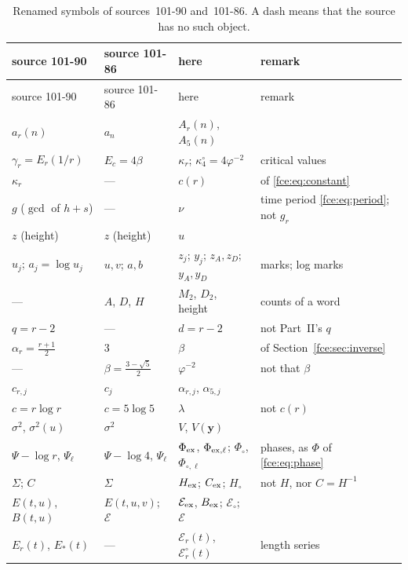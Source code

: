 \documentclass[11pt,a4paper]{article}
\numberwithin{equation}{section}
\theoremstyle{definition}\newtheorem{definition}[theorem]{Definition}
\theoremstyle{remark}\newtheorem{remark}[theorem]{Remark}
\newcommand{\E}{\mathcal E}
\begin{document}
{\small
\begin{longtable}{@{}>{\raggedright\arraybackslash}p{}>{\raggedright\arraybackslash}p{}>{\raggedright\arraybackslash}p{}>{\raggedright\arraybackslash}p{}@{}}
\caption{Renamed symbols of sources~101-90 and~101-86. A dash means that the
source has no such object.}\label{fce:dx:tab:renamed}\\
\toprule
source 101-90 & source 101-86 & here & remark\\
\midrule
\endfirsthead
\toprule
source 101-90 & source 101-86 & here & remark\\
\midrule
\endhead
\bottomrule
\endfoot
$a_r(n)$ & $a_n$ & $A_r(n)$, $A_5(n)$ & \\
$\gamma_r=E_r(1/r)$ & $E_c=4\beta$ & $\kappa_r$; $\kappa^\circ_4=4\varphi^{-2}$ & critical values\\
$\kappa_r$ & --- & $c(r)$ & of \eqref{fce:eq:constant}\\
$g$ ($\gcd$ of $h+s$) & --- & $\nu$ & time period \eqref{fce:eq:period}; not $g_r$\\
$z$ (height) & $z$ (height) & $u$ & \\
$u_j$; $a_j=\log u_j$ & $u,v$; $a,b$ & $z_j$; $y_j$; $z_A,z_D$; $y_A,y_D$ & marks; log marks\\
--- & $A$, $D$, $H$ & $M_2$, $D_2$, height & counts of a word\\
$q=r-2$ & --- & $d=r-2$ & not Part~II's $q$\\
$\alpha_r=\frac{r+1}2$ & $3$ & $\beta$ & of Section~\ref{fce:sec:inverse}\\
--- & $\beta=\frac{3-\sqrt5}2$ & $\varphi^{-2}$ & not that $\beta$\\
$c_{r,j}$ & $c_j$ & $\alpha_{r,j}$, $\alpha_{5,j}$ & \\
$c=r\log r$ & $c=5\log5$ & $\lambda$ & not $c(r)$\\
$\sigma^2$, $\sigma^2(u)$ & $\sigma^2$ & $V$, $V(\boldsymbol y)$ & \\
$\Psi-\log r$, $\Psi_\ell$ & $\Psi-\log4$, $\Psi_\ell$ & $\Phi_{\rm ex}$, $\Phi_{{\rm ex},\ell}$; $\Phi_\circ$, $\Phi_{\circ,\ell}$ & phases, as $\Phi$ of \eqref{fce:eq:phase}\\
$\Sigma$; $C$ & $\Sigma$ & $H_{\rm ex}$; $C_{\rm ex}$; $H_\circ$ & not $H$, nor $C=H^{-1}$\\
$E(t,u)$, $B(t,u)$ & $E(t,u,v)$; $\mathcal E$ & $\E_{\rm ex}$, $B_{\rm ex}$; $\E_\circ$; $\E$ & \\
$E_r(t)$, $E_*(t)$ & --- & $\E_r(t)$, $\E^\circ_r(t)$ & length series\\

\end{longtable}}
\end{document}

